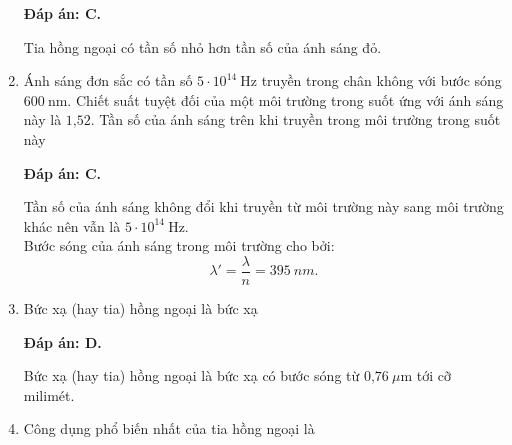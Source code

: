 \begin{enumerate}[label=\bfseries Câu \arabic*:]
	\loigiai
	{		\textbf{Đáp án: C.}
		
Tia hồng ngoại có tần số nhỏ hơn tần số của ánh sáng đỏ.
		
	}
	
	\item {} 
	\cauhoi
	{Ánh sáng đơn sắc có tần số $5\cdot 10^{14}\ \text{Hz}$ truyền trong chân không với bước sóng $600\ \text{nm}$. Chiết suất tuyệt đối của một môi trường trong suốt ứng với ánh sáng này là $\text{1,52}$. Tần số của ánh sáng trên khi truyền trong môi trường trong suốt này
	}
	
	\loigiai
	{		\textbf{Đáp án: C.}
		
Tần số của ánh sáng không đổi khi truyền từ môi trường này sang môi trường khác nên vẫn là $ 5\cdot 10^{14}\ \text{Hz} $. \\
Bước sóng của ánh sáng trong môi trường cho bởi:
$$
	\lambda' = \dfrac{\lambda}{n} = \SI{395}{nm}.
$$
		
	}
	
	\item {} 
	\cauhoi
	{Bức xạ (hay tia) hồng ngoại là bức xạ
	}
	
	\loigiai
	{		\textbf{Đáp án: D.}
		
Bức xạ (hay tia) hồng ngoại là bức xạ có bước sóng từ $\text{0,76}\ \mu\text{m}$ tới cỡ milimét. 
		
	}
	
	\item {}
	\cauhoi
	{Công dụng phổ biến nhất của tia hồng ngoại là
	}
	

\end{enumerate}
